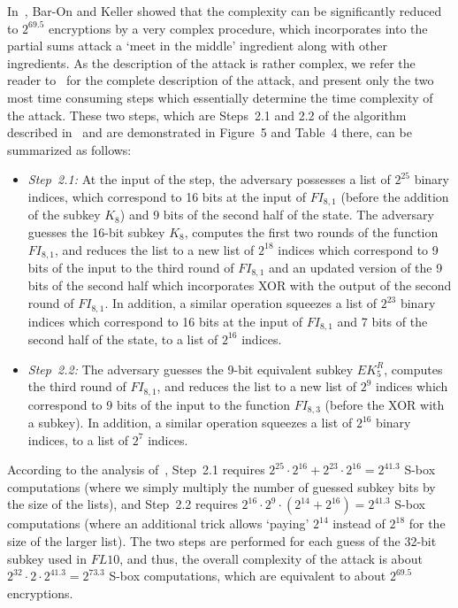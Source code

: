 In~\cite{C:BarKel16}, Bar-On and Keller showed that the complexity can be significantly reduced to $2^{69.5}$ encryptions by a very complex procedure, which incorporates into the partial sums attack a `meet in the middle' ingredient along with other ingredients. As the description of the attack is rather complex, we refer the reader to~\cite{C:BarKel16} for the complete description of the attack, and present only the two most time consuming steps which essentially determine the time complexity of the attack. These two steps, which are Steps~2.1 and 2.2 of the algorithm described in~\cite[Section~4.4]{C:BarKel16} and are demonstrated in  Figure~5 and Table~4 there, can be summarized as follows:
\begin{itemize}
    \item \emph{Step~2.1:} At the input of the step, the adversary possesses a list of $2^{25}$ binary indices, which correspond to 16 bits at the input of $FI_{8,1}$ (before the addition of the subkey $K_8$) and 9 bits of the second half of the state. The adversary guesses the 16-bit subkey $K_8$, computes the first two rounds of the function $FI_{8,1}$, and reduces the list to a new list of $2^{18}$ indices which correspond to 9 bits of the input to the third round of $FI_{8,1}$ and an updated version of the 9 bits of the second half which incorporates XOR with the output of the second round of $FI_{8,1}$. In addition, a similar operation squeezes a list of $2^{23}$ binary indices which correspond to 16 bits at the input of $FI_{8,1}$ and 7 bits of the second half of the state, to a list of $2^{16}$ indices.

    \item \emph{Step~2.2:} The adversary guesses the 9-bit equivalent subkey $EK_5^R$, computes the third round of $FI_{8,1}$, and reduces the list to a new list of $2^{9}$ indices which correspond to 9 bits of the input to the function $FI_{8,3}$ (before the XOR with a subkey). In addition, a similar operation squeezes a list of $2^{16}$ binary indices, to a list of $2^{7}$ indices. 
\end{itemize}
According to the analysis of~\cite{C:BarKel16}, Step~2.1 requires $2^{25} \cdot 2^{16} + 2^{23} \cdot 2^{16} = 2^{41.3}$ S-box computations (where we simply multiply the number of guessed subkey bits by the size of the lists), and Step~2.2 requires $2^{16} \cdot 2^9 \cdot (2^{14}+2^{16})=2^{41.3}$ S-box computations (where an additional trick allows `paying' $2^{14}$ instead of $2^{18}$ for the size of the larger list).
The two steps are performed for each guess of the 32-bit subkey used in $FL10$, and thus, the overall complexity of the attack is about $2^{32} \cdot 2 \cdot 2^{41.3} =2^{73.3}$ S-box computations, which are equivalent to about $2^{69.5}$ encryptions. 

